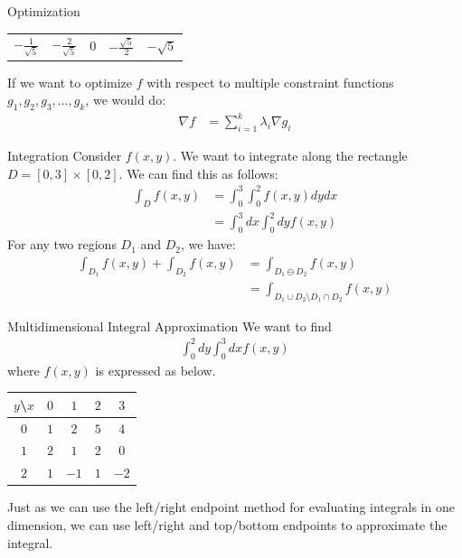 \documentclass[8pt]{extarticle}
\begin{document}
\begin{problem}{Optimization}
\begin{center}
\begin{tabular}{c|c|c|c|c}
        \hline
        $\displaystyle-\frac{1}{\sqrt{5}}$ & $\displaystyle-\frac{2}{\sqrt{5}}$ & 0 & $\displaystyle-\frac{\sqrt{5}}{2}$ & $-\sqrt{5}$\\
      \end{tabular}
    \end{center}
    If we want to optimize $f$ with respect to multiple constraint functions $g_1,g_2,g_3,\dots,g_k$, we would do:
    \begin{align*}
      \nabla f &= \sum_{i=1}^{k}\lambda_i\nabla g_{i}
    \end{align*}
  \end{problem}
  \begin{problem}{Integration}
    Consider $f(x,y)$. We want to integrate along the rectangle $D = [0,3]\times[0,2]$. We can find this as follows:
    \begin{align*}
      \int_{D} f(x,y) &= \int_{0}^{3}\int_{0}^{2}f(x,y) dy dx\\
               &= \int_{0}^{3}dx\int_{0}^{2}dy f(x,y)
    \end{align*}
    For any two regions $D_1$ and $D_2$, we have:
    \begin{align*}
      \int_{D_1}f(x,y) + \int_{D_2}f(x,y) &= \int_{D_1 \ominus D_2}f(x,y)\\
                                          &= \int_{D_1\cup D_2 \setminus D_1 \cap D_2}f(x,y)
    \end{align*}
  \end{problem}
  \begin{problem}{Multidimensional Integral Approximation}
    We want to find
    \begin{align*}
      \int_{0}^{2}dy\int_{0}^{3}dx f(x,y)
    \end{align*}
    where $f(x,y)$ is expressed as below.
    \begin{center}
      \begin{tabular}{c||c|c|c|c|}
        $y$\textbackslash $x$ & $0$ & $1$ & $2$ & $3$ \\
        \hline
        \hline
        $0$ & $1$ & $2$ & $5$ & $4$ \\
        \hline
        $1$ & $2$ & $1$ & $2$ & $0$ \\
        \hline
        $2$ & $1$ & $-1$ & $1$ & $-2$\\
        \hline
      \end{tabular}
    \end{center}
    Just as we can use the left/right endpoint method for evaluating integrals in one dimension, we can use left/right and top/bottom endpoints to approximate the integral.
  \end{problem}
\end{document}
